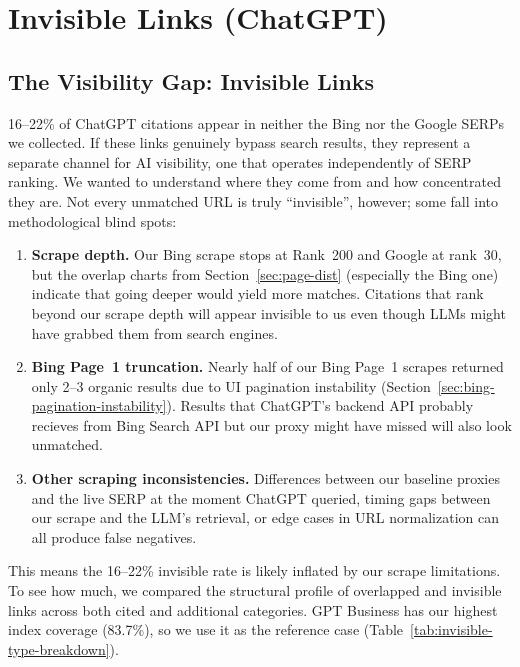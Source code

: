 \section{Invisible Links (ChatGPT)}
\label{sec:invisible-links-section}

\subsection{The Visibility Gap: Invisible Links}
\label{sec:invisible-links}

16--22\% of ChatGPT citations appear in neither the Bing nor the Google SERPs we collected. If these links genuinely bypass search results, they represent a separate channel for AI visibility, one that operates independently of SERP ranking. We wanted to understand where they come from and how concentrated they are. Not every unmatched URL is truly ``invisible'', however; some fall into methodological blind spots:

\begin{enumerate}
\item \textbf{Scrape depth.} Our Bing scrape stops at Rank~200 and Google at
rank~30, but the overlap charts from Section~\ref{sec:page-dist}
(especially the Bing one) indicate that going deeper would yield
more matches. Citations that rank beyond our scrape depth
will appear invisible to us even though LLMs might have grabbed them from 
search engines.
\item \textbf{Bing Page~1 truncation.} Nearly half of our Bing Page~1 scrapes
returned only 2--3 organic results due to UI pagination instability
(Section~\ref{sec:bing-pagination-instability}). Results that ChatGPT's
backend API probably recieves from Bing Search API but our proxy might have missed will also look
unmatched.

\item \textbf{Other scraping inconsistencies.} Differences between our
baseline proxies and the live SERP at the moment ChatGPT queried,
timing gaps between our scrape and the LLM's retrieval, or edge cases
in URL normalization can all produce false negatives.
\end{enumerate}

\label{sec:invisible-conservative}
\noindent This means the 16--22\% invisible rate is likely
inflated by our scrape limitations.
To see how much, we compared the structural profile of overlapped
and invisible links across both cited and additional categories. GPT Business has our highest index
coverage (83.7\%), so we use it as the reference case (Table~\ref{tab:invisible-type-breakdown}).


